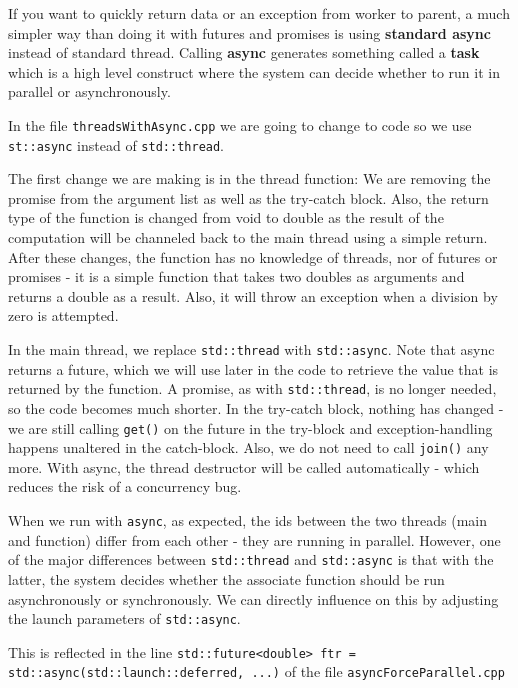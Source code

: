 \documentclass[11pt, a4paper]{article}
\begin{document}
If you want to quickly return data or an exception from worker to parent, a much simpler way than doing it with futures and promises is using \textbf{standard async} instead of standard thread. Calling \textbf{async} generates something called a \textbf{task} which is a high level construct where the system can decide whether to run it in parallel or  asynchronously.  



In the file \texttt{threadsWithAsync.cpp} we are going to change to code so we use \texttt{st::async}  instead of \texttt{std::thread}. 

The first change we are making is in the thread function: We are removing the promise from the argument list as well as the try-catch block. Also, the return type of the function is changed from void to double as the result of the computation will be channeled back to the main thread using a simple return. After these changes, the function has no knowledge of threads, nor of futures or promises - it is a simple function that takes two doubles as arguments and returns a double as a result. Also, it will throw an exception when a division by zero is attempted.

In the main thread, we replace \texttt{std::thread} with \texttt{std::async}. Note that async returns a future, which we will use later in the code to retrieve the value that is returned by the function. A promise, as with \texttt{std::thread}, is no longer needed, so the code becomes much shorter. In the try-catch block, nothing has changed - we are still calling \texttt{get()} on the future in the try-block and exception-handling happens unaltered in the catch-block. Also, we do not need to call \texttt{join()} any more. With async, the thread destructor will be called automatically - which reduces the risk of a concurrency bug.

When we run with \texttt{async}, as expected, the ids between the two threads (main and function) differ from each other - they are running in parallel. However, one of the major differences between \texttt{std::thread} and \texttt{std::async} is that with the latter, the system decides whether the associate function should be run asynchronously or synchronously. We can directly influence on this by adjusting the launch parameters of \texttt{std::async}. 

This is reflected in the line \texttt{std::future<double> ftr = std::async(std::launch::deferred, ...)} of the file \texttt{asyncForceParallel.cpp }
\end{document}
